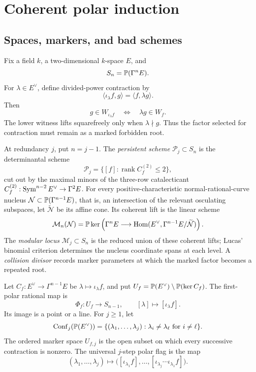 \section{Coherent polar induction}\label{sec:polar}

\subsection{Spaces, markers, and bad schemes}

Fix a field $k$, a two-dimensional $k$-space $E$, and
\[
  S_n=\mathbb P(\Gamma^nE).
\]
For $\lambda\in E^\vee$, define divided-power contraction by
\[
 \langle\iota_\lambda f,g\rangle=\langle f,\lambda g\rangle.
\]
Then
\begin{equation}\label{eq:lift}
 g\in W_{\iota_\lambda f}\quad\Longleftrightarrow\quad
 \lambda g\in W_f.
\end{equation}
The lower witness lifts squarefreely only when $\lambda\nmid g$.
Thus the factor selected for contraction must remain as a marked
forbidden root.

\begin{definition}\label{def:carriers}
At redundancy \(j\), put \(n=j-1\).  The \emph{persistent scheme}
\(\mathcal P_j\subset S_n\) is the determinantal scheme
\[
 \mathcal P_j
 =\{[f]:\operatorname{rank}C_f^{(2)}\leq2\},
\]
cut out by the maximal minors of the three-row catalecticant
\(C_f^{(2)}:\operatorname{Sym}^{n-2}E^\vee\to\Gamma^2E\).
For every positive-characteristic normal-rational-curve nucleus
\(\mathcal N\subset\mathbb P(\Gamma^{n-1}E)\), that is, an intersection of
the relevant osculating subspaces, let
\(\widetilde{\mathcal N}\) be its affine cone.  Its coherent lift is
the linear scheme
\[
 \mathcal M_n(\mathcal N)=
 \mathbb P\ker\left(
 \Gamma^nE\longrightarrow
 \operatorname{Hom}(E^\vee,\Gamma^{n-1}E/\widetilde{\mathcal N})
 \right).
\]
The \emph{modular locus} \(\mathcal M_j\subset S_n\) is the reduced
union of these coherent lifts; Lucas' binomial criterion determines
the nucleus coordinate spans at each level.  A
\emph{collision divisor} records marker parameters at which the
marked factor becomes a repeated root.
\end{definition}

\begin{definition}\label{def:polar-spaces}
Let $C_f:E^\vee\to\Gamma^{n-1}E$ be
$\lambda\mapsto\iota_\lambda f$, and put
$U_f=\mathbb P(E^\vee)\setminus\mathbb P(\ker C_f)$.  The first-polar rational map
is
\[
 \Phi_f:U_f\longrightarrow S_{n-1},\qquad
 [\lambda]\longmapsto[\iota_\lambda f]
.
\]
Its image is a point or a line.  For $j\geq1$, let
\[
\operatorname{Conf}_j(\mathbb P(E^\vee))
=\{(\lambda_1,\ldots,\lambda_j):\lambda_i\ne\lambda_\ell
  \text{ for }i\ne\ell\}.
\]
The ordered marker space $U_{f,j}$ is the open subset on which every
successive contraction is nonzero.  The universal $j$-step polar flag
is the map
\[
(\lambda_1,\ldots,\lambda_j)\longmapsto
\bigl([\iota_{\lambda_1}f],\ldots,
[\iota_{\lambda_j}\cdots\iota_{\lambda_1}f]\bigr).
\]
\end{definition}

